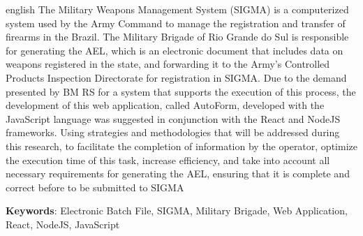 \begin{resumo}[Abstract]
 \begin{otherlanguage*}{english}
  The Military Weapons Management System (SIGMA) is a computerized system used
  by the Army Command to manage the registration and transfer of firearms in the
  Brazil. The Military Brigade of Rio Grande do Sul is responsible for generating the AEL, which is an electronic document that includes data on weapons registered in the state, and forwarding it to the Army's Controlled Products Inspection Directorate for registration in SIGMA. Due to the demand presented
  by BM RS for a system that supports the execution of this process, the development of this web application, called AutoForm, developed with the JavaScript language was suggested
  in conjunction with the React and NodeJS frameworks. Using strategies and methodologies
  that will be addressed during this research, to facilitate the completion of information by the
  operator, optimize the execution time of this task, increase efficiency, and take into account all
  necessary requirements for generating the AEL, ensuring that it is complete and correct before
  to be submitted to SIGMA

   \vspace{\onelineskip}
 
   \noindent 
   \textbf{Keywords}: Electronic Batch File, SIGMA, Military Brigade, Web Application, React, NodeJS, JavaScript%
 \end{otherlanguage*}
\end{resumo}